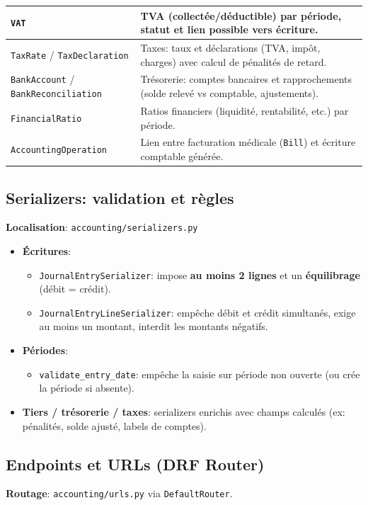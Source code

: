 \documentclass[12pt,a4paper]{article}
\begin{document}
\begin{longtable}{|p{4.2cm}|p{10.2cm}|}
\texttt{VAT} & TVA (collectée/déductible) par période, statut et lien possible vers écriture. \\ \hline
\texttt{TaxRate} / \texttt{TaxDeclaration} & Taxes: taux et déclarations (TVA, impôt, charges) avec calcul de pénalités de retard. \\ \hline
\texttt{BankAccount} / \texttt{BankReconciliation} & Trésorerie: comptes bancaires et rapprochements (solde relevé vs comptable, ajustements). \\ \hline
\texttt{FinancialRatio} & Ratios financiers (liquidité, rentabilité, etc.) par période. \\ \hline
\texttt{AccountingOperation} & Lien entre facturation médicale (\texttt{Bill}) et écriture comptable générée. \\ \hline
\end{longtable}

\subsection{Serializers: validation et règles}
\textbf{Localisation}: \texttt{accounting/serializers.py}

\begin{itemize}[leftmargin=1.2cm]
  \item \textbf{Écritures}:
  \begin{itemize}[leftmargin=1.2cm]
    \item \texttt{JournalEntrySerializer}: impose \textbf{au moins 2 lignes} et un \textbf{équilibrage} (débit = crédit).
    \item \texttt{JournalEntryLineSerializer}: empêche débit et crédit simultanés, exige au moins un montant, interdit les montants négatifs.
  \end{itemize}
  \item \textbf{Périodes}:
  \begin{itemize}[leftmargin=1.2cm]
    \item \texttt{validate\_entry\_date}: empêche la saisie sur période non ouverte (ou crée la période si absente).
  \end{itemize}
  \item \textbf{Tiers / trésorerie / taxes}: serializers enrichis avec champs calculés (ex: pénalités, solde ajusté, labels de comptes).
\end{itemize}

\subsection{Endpoints et URLs (DRF Router)}
\textbf{Routage}: \texttt{accounting/urls.py} via \texttt{DefaultRouter}.
\end{document}

